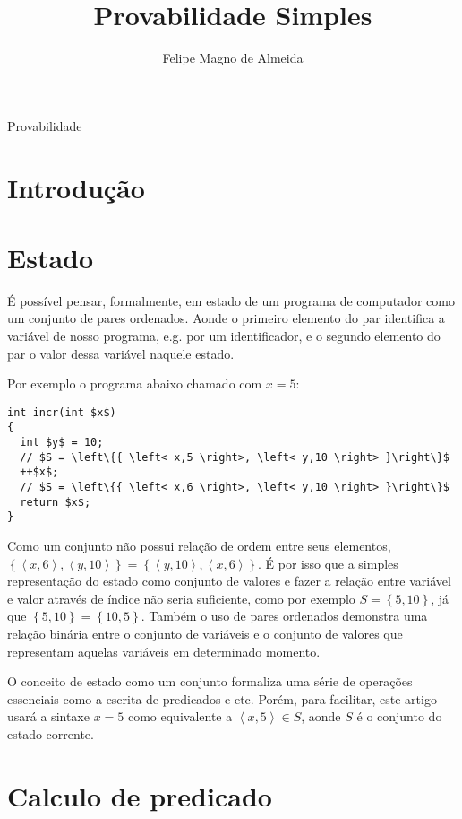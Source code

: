 \documentclass[12pt]{article}
\title{Provabilidade Simples}
\author{Felipe Magno de Almeida}
\begin{document}
 

\maketitle
     
\begin{resumo} 

  Provabilidade

\end{resumo}

\section{Introdução}

\section{Estado}

É possível pensar, formalmente, em estado de um programa de computador
como um conjunto de pares ordenados. Aonde o primeiro elemento do par
identifica a variável de nosso programa, e.g. por um identificador, e
o segundo elemento do par o valor dessa variável naquele estado.

Por exemplo o programa abaixo chamado com $x=5$:

\begin{lstlisting}[mathescape=true]
int incr(int $x$)
{
  int $y$ = 10;
  // $S = \left\{{ \left< x,5 \right>, \left< y,10 \right> }\right\}$
  ++$x$;
  // $S = \left\{{ \left< x,6 \right>, \left< y,10 \right> }\right\}$
  return $x$;
}
\end{lstlisting}

Como um conjunto não possui relação de ordem entre seus elementos,
$\left\{{ \left< x,6 \right>, \left< y,10 \right> }\right\} = \left\{{
    \left< y,10 \right>, \left< x,6 \right> }\right\}$. É por isso que
a simples representação do estado como conjunto de valores e fazer a
relação entre variável e valor através de índice não seria suficiente,
como por exemplo $S = \left\{{5,10}\right\}$, já que
$\left\{{5,10}\right\} = \left\{{10,5}\right\}$. Também o uso de pares
ordenados demonstra uma relação binária entre o conjunto de variáveis
e o conjunto de valores que representam aquelas variáveis em
determinado momento.

O conceito de estado como um conjunto formaliza uma série de operações
essenciais como a escrita de predicados e etc. Porém, para facilitar,
este artigo usará a sintaxe $x = 5$ como equivalente a
$\left<x,5\right> \in S$, aonde $S$ é o conjunto do estado corrente.

\section{Calculo de predicado}
\end{document}

